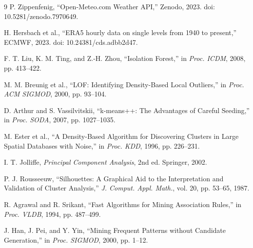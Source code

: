 \documentclass[conference]{IEEEtran}
\begin{document}
\begin{thebibliography}{9}
P. Zippenfenig, ``Open-Meteo.com Weather API,'' Zenodo, 2023.
doi: 10.5281/zenodo.7970649.

H. Hersbach et al., ``ERA5 hourly data on single levels from 1940 to present,'' ECMWF, 2023.
doi: 10.24381/cds.adbb2d47.

F. T. Liu, K. M. Ting, and Z.-H. Zhou, ``Isolation Forest,'' in \emph{Proc. ICDM}, 2008, pp. 413--422.

M. M. Breunig et al., ``LOF: Identifying Density-Based Local Outliers,'' in \emph{Proc. ACM SIGMOD},
2000, pp. 93--104.

D. Arthur and S. Vassilvitskii, ``k-means++: The Advantages of Careful Seeding,'' in \emph{Proc.
SODA}, 2007, pp. 1027--1035.

M. Ester et al., ``A Density-Based Algorithm for Discovering Clusters in Large Spatial Databases with
Noise,'' in \emph{Proc. KDD}, 1996, pp. 226--231.

I. T. Jolliffe, \emph{Principal Component Analysis}, 2nd ed. Springer, 2002.

P. J. Rousseeuw, ``Silhouettes: A Graphical Aid to the Interpretation and Validation of Cluster
Analysis,'' \emph{J. Comput. Appl. Math.}, vol. 20, pp. 53--65, 1987.

R. Agrawal and R. Srikant, ``Fast Algorithms for Mining Association Rules,'' in \emph{Proc. VLDB},
1994, pp. 487--499.

J. Han, J. Pei, and Y. Yin, ``Mining Frequent Patterns without Candidate Generation,'' in
\emph{Proc. SIGMOD}, 2000, pp. 1--12.
\end{thebibliography}
\end{document}

